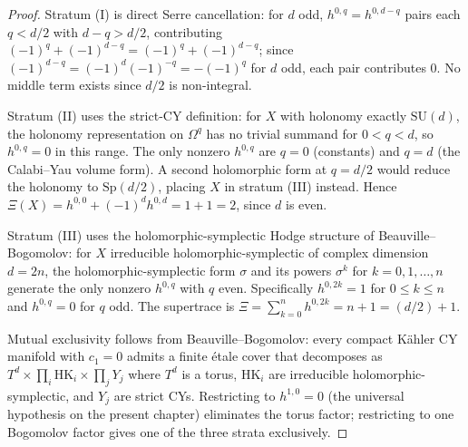 \begin{proof}
Stratum (I) is direct Serre cancellation: for $d$ odd,
$h^{0, q} = h^{0, d - q}$ pairs each $q < d/2$ with $d - q > d/2$,
contributing $(-1)^q + (-1)^{d - q} = (-1)^q + (-1)^{d - q}$;
since $(-1)^{d - q} = (-1)^d (-1)^{-q} = -(-1)^q$ for $d$ odd, each
pair contributes $0$. No middle term exists since $d/2$ is
non-integral.

Stratum (II) uses the strict-CY definition: for $X$ with holonomy exactly
$\mathrm{SU}(d)$, the holonomy representation on $\Omega^q$ has no trivial
summand for $0 < q < d$, so $h^{0, q} = 0$ in this range. The only
nonzero $h^{0, q}$ are $q = 0$ (constants) and $q = d$ (the Calabi--Yau
volume form). A second holomorphic form at $q = d/2$ would reduce the
holonomy to $\mathrm{Sp}(d/2)$, placing $X$ in stratum \textup{(III)}
instead. Hence $\Xi(X) = h^{0, 0} + (-1)^d h^{0, d} = 1 + 1 = 2$, since
$d$ is even.

Stratum (III) uses the holomorphic-symplectic Hodge structure of
Beauville--Bogomolov: for $X$ irreducible holomorphic-symplectic of
complex dimension $d = 2n$, the holomorphic-symplectic form $\sigma$ and
its powers $\sigma^k$ for $k = 0, 1, \ldots, n$ generate the only nonzero
$h^{0, q}$ with $q$ even. Specifically $h^{0, 2k} = 1$ for $0 \leq k \leq n$
and $h^{0, q} = 0$ for $q$ odd. The supertrace is
$\Xi = \sum_{k = 0}^n h^{0, 2k} = n + 1 = (d/2) + 1$.

Mutual exclusivity follows from Beauville--Bogomolov: every compact
K\"ahler CY manifold with $c_1 = 0$ admits a finite \'etale cover that
decomposes as $T^d \times \prod_i \mathrm{HK}_i \times \prod_j Y_j$
where $T^d$ is a torus, $\mathrm{HK}_i$ are irreducible holomorphic-symplectic,
and $Y_j$ are strict CYs. Restricting to $h^{1, 0} = 0$ \textup{(}the
universal hypothesis on the present chapter\textup{)} eliminates the
torus factor; restricting to one Bogomolov factor gives one of the three
strata exclusively.
\end{proof}

